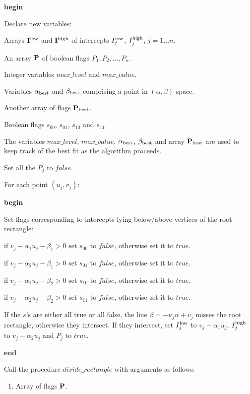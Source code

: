   {\bf begin}
  \begin{indent_para}
   Declare new variables:
   \begin{indent_para}
    Arrays ${\bf I}^{\rm low}$ and ${\bf I}^{\rm high}$ of intercepts
    $I^{\rm low}_j$, $I^{\rm high}_j$, $j=1 \ldots n$.

    An array ${\bf P}$ of boolean flags $P_1, P_2,\ldots,P_n$.

    Integer variables $max\_level$ and $max\_value$.

    Variables $\alpha_{\rm best}$ and $\beta_{\rm best}$ comprising a point in
    $(\alpha , \beta)$ space.

    Another array of flags ${\bf P}_{\rm best}$.

    Boolean flags $s_{00}$, $s_{01}$, $s_{10}$ and $s_{11}$.
   \end{indent_para}

   The variables $max\_level$, $max\_value$, $\alpha_{\rm best}$,
   $\beta_{\rm best}$ and
   array ${\bf P}_{\rm best}$ are used to keep track of the best fit as the
   algorithm proceeds.

   Set all the $P_j$ to $false$.

   For each point $(u_j,v_j)$:

   {\bf begin}
   \begin{indent_para}
    Set flags corresponding to intercepts lying below/above vertices of
    the root rectangle:

    if $v_j - \alpha_1 u_j - \beta_1 > 0$ set $s_{00}$ to $false$,
    otherwise set it to $true$.

    if $v_j - \alpha_2 u_j - \beta_1 > 0$ set $s_{01}$ to $false$,
    otherwise set it to $true$.

    if $v_j - \alpha_1 u_j - \beta_2 > 0$ set $s_{10}$ to $false$,
    otherwise set it to $true$.

    if $v_j - \alpha_2 u_j - \beta_2 > 0$ set $s_{11}$ to $false$,
    otherwise set it to $true$.

    If the $s$'s are either all true or all false, the line
    $\beta = -u_j \alpha + v_j$ misses the root rectangle,
    otherwise they intersect. If they intersect, set
    $I^{\rm low}_j$ to $v_j - \alpha_1 u_j$,
    $I^{\rm high}_j$ to $v_j - \alpha_2 u_j$ and $P_j$ to $true$.
    \end{indent_para}
   {\bf end}

   Call the procedure $divide\_rectangle$ with arguments as follows:
   \begin{enumerate}
	  \item Array of flags ${\bf P}$.


\end{enumerate}
\end{indent_para}
